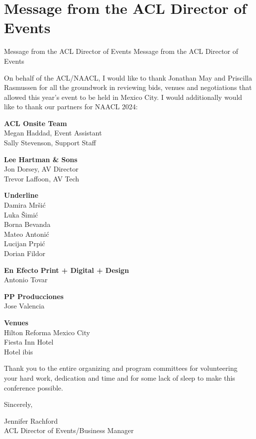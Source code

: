 \section{Message from the ACL Director of Events}\vspace{2em}
\setheaders%
    {Message from the ACL Director of Events}%
    {Message from the ACL Director of Events}
\thispagestyle{emptyheader}
\setlength{\parskip}{1ex}
\setlength{\parindent}{0pt}

On behalf of the ACL/NAACL, I would like to thank Jonathan May and Priscilla Rasmussen for all the groundwork in reviewing bids, venues and negotiations that allowed this year's event to be held in Mexico City. 
I would additionally would like to thank our partners for NAACL 2024:

\textbf{ACL Onsite Team}\\
\hspace*{0.2in}Megan Haddad, Event Assistant\\
\hspace*{0.2in}Sally Stevenson, Support Staff

\textbf{Lee Hartman \& Sons} \\
\hspace*{0.2in}Jon Dorsey, AV Director \\
\hspace*{0.2in}Trevor Laffoon, AV Tech

\textbf{Underline} \\
\hspace*{0.2in}Damira Mr\v{s}i\'c \\
\hspace*{0.2in}Luka \v{S}imi\'c \\
\hspace*{0.2in}Borna Bevanda \\
\hspace*{0.2in}Mateo Antoni\'c \\
\hspace*{0.2in}Lucijan Prpi\'c \\
\hspace*{0.2in}Dorian Fildor 

\textbf{En Efecto Print + Digital + Design} \\
\hspace*{0.2in}Antonio Tovar 

\textbf{PP Producciones} \\
\hspace*{0.2in}Jose Valencia 

\textbf{Venues} \\ 
\hspace*{0.2in}Hilton Reforma Mexico City \\
\hspace*{0.2in}Fiesta Inn Hotel  \\
\hspace*{0.2in}Hotel ibis

Thank you to the entire organizing and program committees for volunteering your hard work, dedication and time and for some lack of sleep to make this conference possible.

\vspace{1em}

Sincerely,

Jennifer Rachford\\
ACL Director of Events/Business Manager